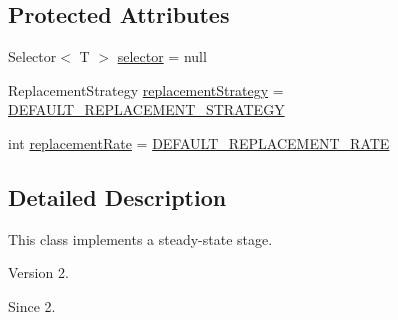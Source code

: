 \subsection*{Protected Attributes}
\begin{DoxyCompactItemize}
\item 
Selector$<$ T $>$ \hyperlink{classjenes_1_1stage_1_1operator_1_1common_1_1_steady_state_3_01_t_01extends_01_chromosome_01_4_a83a734a69acdc4ee13d42982a43e8ba1}{selector} = null
\item 
Replacement\-Strategy \hyperlink{classjenes_1_1stage_1_1operator_1_1common_1_1_steady_state_3_01_t_01extends_01_chromosome_01_4_a4d727adbb35eaad5d78fc59abaabea0c}{replacement\-Strategy} = \hyperlink{classjenes_1_1stage_1_1operator_1_1common_1_1_steady_state_3_01_t_01extends_01_chromosome_01_4_a4ed786deaaaefebd47fffc18e99b3710}{D\-E\-F\-A\-U\-L\-T\-\_\-\-R\-E\-P\-L\-A\-C\-E\-M\-E\-N\-T\-\_\-\-S\-T\-R\-A\-T\-E\-G\-Y}
\item 
int \hyperlink{classjenes_1_1stage_1_1operator_1_1common_1_1_steady_state_3_01_t_01extends_01_chromosome_01_4_a84dd70ced0dad9433e4168f18eb735f9}{replacement\-Rate} = \hyperlink{classjenes_1_1stage_1_1operator_1_1common_1_1_steady_state_3_01_t_01extends_01_chromosome_01_4_a9700692d577e24267d1105f2a6e3d379}{D\-E\-F\-A\-U\-L\-T\-\_\-\-R\-E\-P\-L\-A\-C\-E\-M\-E\-N\-T\-\_\-\-R\-A\-T\-E}
\end{DoxyCompactItemize}


\subsection{Detailed Description}
This class implements a steady-\/state stage.

\begin{DoxyVersion}{Version}
2. 
\end{DoxyVersion}
\begin{DoxySince}{Since}
2. 
\end{DoxySince}


